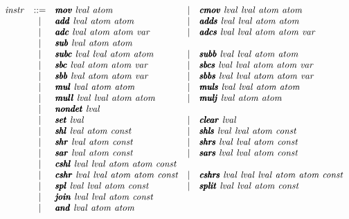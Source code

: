 \documentclass{article}
\begin{document}
\[
\begin{array}{rclcl}
  \instr &  ::= & \pmb\imov\ \lval\ \atom
         & \mid & \pmb\icmov\ \lval\ \lval\ \atom\ \atom \\
         & \mid & \pmb\iadd\ \lval\ \atom\ \atom
         & \mid & \pmb\iadds\ \lval\ \lval\ \atom\ \atom \\
         & \mid & \pmb\iadc\ \lval\ \atom\ \atom\ \var
         & \mid & \pmb\iadcs\ \lval\ \lval\ \atom\ \atom\ \var \\
         & \mid & \pmb\isub\ \lval\ \atom\ \atom \\
         & \mid & \pmb\isubc\ \lval\ \lval\ \atom\ \atom
         & \mid & \pmb\isubb\ \lval\ \lval\ \atom\ \atom \\
         & \mid & \pmb\isbc\ \lval\ \atom\ \atom\ \var
         & \mid & \pmb\isbcs\ \lval\ \lval\ \atom\ \atom\ \var \\
         & \mid & \pmb\isbb\ \lval\ \atom\ \atom\ \var
         & \mid & \pmb\isbbs\ \lval\ \lval\ \atom\ \atom\ \var \\
         & \mid & \pmb\imul\ \lval\ \atom\ \atom
         & \mid & \pmb\imuls\ \lval\ \lval\ \atom\ \atom \\
         & \mid & \pmb\imull\ \lval\ \lval\ \atom\ \atom
         & \mid & \pmb\imulj\ \lval\ \atom\ \atom \\
         & \mid & \pmb\inondet\ \lval \\
         & \mid & \pmb\iset\ \lval
         & \mid & \pmb\iclear\ \lval \\
         & \mid & \pmb\ishl\ \lval\ \atom\ \const
         & \mid & \pmb\ishls\ \lval\ \lval\ \atom\ \const \\
         & \mid & \pmb\ishr\ \lval\ \atom\ \const
         & \mid & \pmb\ishrs\ \lval\ \lval\ \atom\ \const \\
         & \mid & \pmb\isar\ \lval\ \atom\ \const
         & \mid & \pmb\isars\ \lval\ \lval\ \atom\ \const \\
         & \mid & \pmb\icshl\ \lval\ \lval\ \atom\ \atom\ \const \\
         & \mid & \pmb\icshr\ \lval\ \lval\ \atom\ \atom\ \const
         & \mid & \pmb\icshrs\ \lval\ \lval\ \lval\ \atom\ \atom\ \const \\
         & \mid & \pmb\ispl\ \lval\ \lval\ \atom\ \const
         & \mid & \pmb\isplit\ \lval\ \lval\ \atom\ \const \\
         & \mid & \pmb\ijoin\ \lval\ \lval\ \atom\ \const \\
         & \mid & \pmb\iand\ \lval\ \atom\ \atom

\end{array}\]
\end{document}
